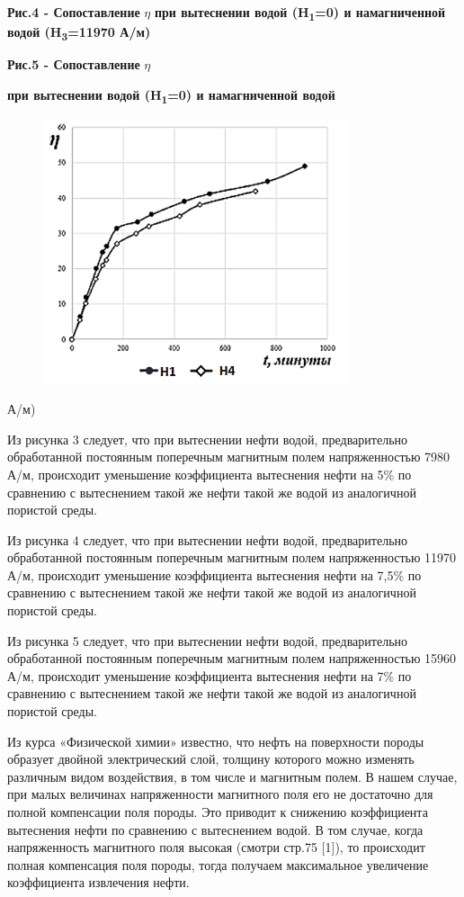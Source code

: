 {\bfseries Рис.4 - Сопоставление} \(\eta\) {\bfseries при вытеснении водой
(H\textsubscript{1}=0) и намагниченной водой (H\textsubscript{3}=11970
А/м)}

{\bfseries Рис.5 - Сопоставление} \(\eta\) {\bfseries при вытеснении водой
(H\textsubscript{1}=0) и намагниченной водой
\begin{figure}[H]
	\centering
	\includegraphics[width=0.8\textwidth]{media/gorn4/image6}
	\caption*{}
\end{figure}

А/м)}

Из рисунка 3 следует, что при вытеснении нефти водой, предварительно
обработанной постоянным поперечным магнитным полем напряженностью 7980
А/м, происходит уменьшение коэффициента вытеснения нефти на 5\% по
сравнению с вытеснением такой же нефти такой же водой из аналогичной
пористой среды.

Из рисунка 4 следует, что при вытеснении нефти водой, предварительно
обработанной постоянным поперечным магнитным полем напряженностью 11970
А/м, происходит уменьшение коэффициента вытеснения нефти на 7,5\% по
сравнению с вытеснением такой же нефти такой же водой из аналогичной
пористой среды.

Из рисунка 5 следует, что при вытеснении нефти водой, предварительно
обработанной постоянным поперечным магнитным полем напряженностью 15960
А/м, происходит уменьшение коэффициента вытеснения нефти на 7\% по
сравнению с вытеснением такой же нефти такой же водой из аналогичной
пористой среды.

Из курса «Физической химии» известно, что нефть на поверхности породы
образует двойной электрический слой, толщину которого можно изменять
различным видом воздействия, в том числе и магнитным полем. В нашем
случае, при малых величинах напряженности магнитного поля его не
достаточно для полной компенсации поля породы. Это приводит к снижению
коэффициента вытеснения нефти по сравнению с вытеснением водой. В том
случае, когда напряженность магнитного поля высокая (смотри стр.75
{[}1{]}), то происходит полная компенсация поля породы, тогда получаем
максимальное увеличение коэффициента извлечения нефти.

